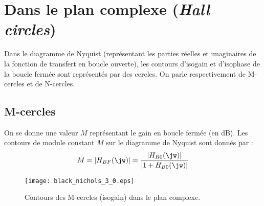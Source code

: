 \section{Dans le plan complexe (\emph{Hall circles})}
Dans le diagramme de Nyquist (représentant les parties réelles et imaginaires de 
la fonction de transfert en boucle ouverte), les contours d'isogain et 
d'isophase de la boucle fermée sont représentés par des cercles. 
On parle respectivement de M-cercles et de N-cercles. 
\subsection{M-cercles}
On se donne une valeur $M$ représentant le gain en boucle fermée (en \si{\dB}). 
Les contours de module constant $M$ sur le diagramme de Nyquist 
sont donnés par :
\[
    M=|H_{BF}(\jw)|=\dfrac{|H_{B0}(\jw)|}{|1+H_{B0}(\jw)|}
\]
\begin{figure}[!h]
\begin{center}
    \texttt{[image: black\_nichols\_3\_0.eps]}
\end{center}
    \caption{Contours des M-cercles (isogain) dans le plan complexe.}
\end{figure}
